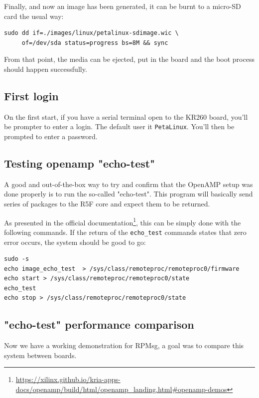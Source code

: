 \documentclass[10pt]{article}
\begin{document}
Finally, and now an image has been generated, it can be burnt to a micro-SD card the usual way:
\begin{verbatim}
sudo dd if=./images/linux/petalinux-sdimage.wic \
     of=/dev/sda status=progress bs=8M && sync
\end{verbatim}

From that point, the media can be ejected, put in the board and the boot process
should happen successfully.

\subsection{First login}
\label{sec:orgba7bbcd}
On the first start, if you have a serial terminal open to the KR260 board, you'll be prompter to enter a login.
The default user it \texttt{PetaLinux}. You'll then be prompted to enter a password.

\subsection{Testing openamp "echo-test"}
\label{sec:org5e2ffa1}
A good and out-of-the-box way to try and confirm that the OpenAMP setup was done
properly is to run the so-called "echo-test". This program will basically send
series of packages to the R5F core and expect them to be returned.

As presented in the official documentation\footnote{\url{https://xilinx.github.io/kria-apps-docs/openamp/build/html/openamp\_landing.html\#openamp-demos}\label{org635d8c8}}, this can be simply done with
the following commands. If the return of the \texttt{echo\_test} commands states that zero
error occurs, the system should be good to go:
\begin{verbatim}
sudo -s
echo image_echo_test  > /sys/class/remoteproc/remoteproc0/firmware
echo start > /sys/class/remoteproc/remoteproc0/state
echo_test
echo stop > /sys/class/remoteproc/remoteproc0/state
\end{verbatim}

\subsection{"echo-test" performance comparison}
\label{sec:orgf0e5bf0}

Now we have a working demonstration for RPMsg, a goal was to compare this system between boards.
\end{document}
